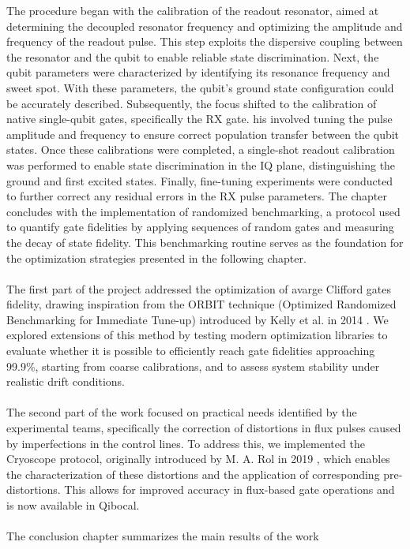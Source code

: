 The procedure began with the calibration of the readout resonator, aimed at determining the decoupled resonator frequency and optimizing the amplitude and frequency of the readout pulse. 
This step exploits the dispersive coupling between the resonator and the qubit to enable reliable state discrimination.
Next, the qubit parameters were characterized by identifying its resonance frequency and sweet spot. 
With these parameters, the qubit's ground state configuration could be accurately described.
Subsequently, the focus shifted to the calibration of native single-qubit gates, specifically the RX gate. 
his involved tuning the pulse amplitude and frequency to ensure correct population transfer between the qubit states.
Once these calibrations were completed, a single-shot readout calibration was performed to enable state discrimination in the IQ plane, distinguishing the ground and first excited states.
Finally, fine-tuning experiments were conducted to further correct any residual errors in the RX pulse parameters. 
The chapter concludes with the implementation of randomized benchmarking, a protocol used to quantify gate fidelities by applying sequences of random gates and measuring the decay of state fidelity. This benchmarking routine serves as the foundation for the optimization strategies presented in the following chapter.


\paragraph{}
The first part of the project addressed the optimization of avarge Clifford gates fidelity, drawing inspiration from the ORBIT technique (Optimized Randomized Benchmarking for Immediate Tune-up) introduced by Kelly et al. in 2014 \cite{kelly_optimal_2014}. 
We explored extensions of this method by testing modern optimization libraries to evaluate whether it is possible to efficiently reach gate fidelities approaching 99.9\%, starting from coarse calibrations, and to assess system stability under realistic drift conditions.

\paragraph{}
The second part of the work focused on practical needs identified by the experimental teams, specifically the correction of distortions in flux pulses caused by imperfections in the control lines. 
To address this, we implemented the Cryoscope protocol, originally introduced by M. A. Rol in 2019 \cite{rol_time-domain_2020}, which enables the characterization of these distortions and the application of corresponding pre-distortions. This allows for improved accuracy in flux-based gate operations and is now available in Qibocal.

\paragraph{}
The conclusion chapter summarizes the main results of the work